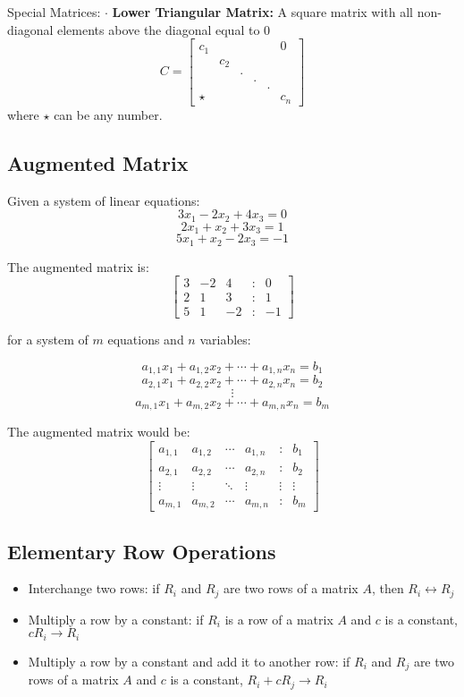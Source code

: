 \documentclass{article}
\begin{document}
\begin{paragraph}{Special Matrices:}
    $\cdot$ \textbf{Lower Triangular Matrix:} A square matrix with all non-diagonal elements above the diagonal equal to 0
        $$ C = \begin{bmatrix}
            c_1 &&&&& 0 \\
            &c_2&&&&\\
            &&.&&&\\
            &&&.&&\\
            &&&&.&\\
            \star&&&&&c_n
        \end{bmatrix}$$
        where $\star$ can be any number.
\end{paragraph}

\subsection*{Augmented Matrix}
Given a system of linear equations:
    $$
    3x_1 - 2x_2 + 4x_3 = 0
    $$
    $$
    2x_1 + x_2 + 3x_3 = 1
    $$
    $$
    5x_1 + x_2 - 2x_3 = -1
    $$
    
The augmented matrix is:
$$
\begin{bmatrix}
    3 & -2 & 4 & : & 0 \\
    2 & 1 & 3 & : & 1 \\
    5 & 1 & -2 & : & -1 
\end{bmatrix}
$$    

for a system of $m$ equations and $n$ variables:

    $$
    a_{1,1} x_1 + a_{1,2} x_2 + \cdots + a_{1,n} x_n = b_1
    $$
    $$
    a_{2,1} x_1 + a_{2,2} x_2 + \cdots + a_{2,n} x_n = b_2
    $$
    $$
    \vdots
    $$
    $$
    a_{m,1} x_1 + a_{m,2} x_2 + \cdots + a_{m,n} x_n = b_m
    $$

The augmented matrix would be:
$$
\begin{bmatrix}
    a_{1,1} & a_{1,2} & \cdots & a_{1,n} & : & b_1 \\
    a_{2,1} & a_{2,2} & \cdots & a_{2,n} & : & b_2 \\
    \vdots & \vdots & \ddots & \vdots & \vdots & \vdots \\
    a_{m,1} & a_{m,2} & \cdots & a_{m,n} & : & b_m
\end{bmatrix}
$$

\subsection*{Elementary Row Operations}
\begin{itemize}
    \item Interchange two rows: if $R_i$ and $R_j$ are two rows of a matrix $A$, then $R_i \leftrightarrow R_j$ 
    \item Multiply a row by a constant: if $R_i$ is a row of a matrix $A$ and $c$ is a constant, $cR_i \rightarrow R_i$
    \item Multiply a row by a constant and add it to another row: if $R_i$ and $R_j$ are two rows of a matrix $A$ and $c$ is a constant, $R_i + cR_j \rightarrow R_i$
\end{itemize}
\end{document}

